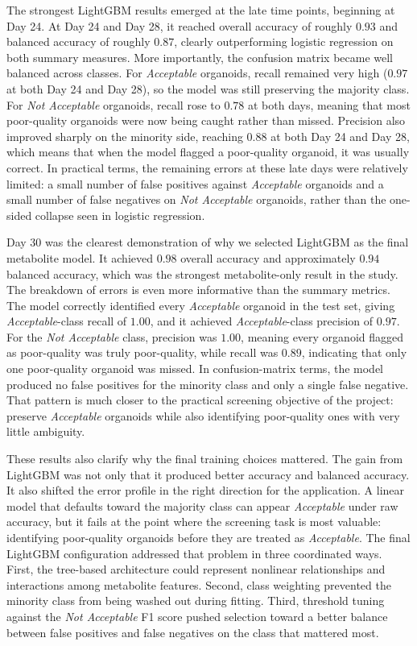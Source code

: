 \documentclass{article}
\begin{document}
The strongest LightGBM results emerged at the late time points, beginning at Day 24. At Day 24 and Day 28, it reached overall accuracy of roughly $0.93$ and balanced accuracy of roughly $0.87$, clearly outperforming logistic regression on both summary measures. More importantly, the confusion matrix became well balanced across classes. For \textit{Acceptable} organoids, recall remained very high ($0.97$ at both Day 24 and Day 28), so the model was still preserving the majority class. For \textit{Not Acceptable} organoids, recall rose to $0.78$ at both days, meaning that most poor-quality organoids were now being caught rather than missed. Precision also improved sharply on the minority side, reaching $0.88$ at both Day 24 and Day 28, which means that when the model flagged a poor-quality organoid, it was usually correct. In practical terms, the remaining errors at these late days were relatively limited: a small number of false positives against \textit{Acceptable} organoids and a small number of false negatives on \textit{Not Acceptable} organoids, rather than the one-sided collapse seen in logistic regression.

Day 30 was the clearest demonstration of why we selected LightGBM as the final metabolite model. It achieved $0.98$ overall accuracy and approximately $0.94$ balanced accuracy, which was the strongest metabolite-only result in the study. The breakdown of errors is even more informative than the summary metrics. The model correctly identified every \textit{Acceptable} organoid in the test set, giving \textit{Acceptable}-class recall of $1.00$, and it achieved \textit{Acceptable}-class precision of $0.97$. For the \textit{Not Acceptable} class, precision was $1.00$, meaning every organoid flagged as poor-quality was truly poor-quality, while recall was $0.89$, indicating that only one poor-quality organoid was missed. In confusion-matrix terms, the model produced no false positives for the minority class and only a single false negative. That pattern is much closer to the practical screening objective of the project: preserve \textit{Acceptable} organoids while also identifying poor-quality ones with very little ambiguity.

These results also clarify why the final training choices mattered. The gain from LightGBM was not only that it produced better accuracy and balanced accuracy. It also shifted the error profile in the right direction for the application. A linear model that defaults toward the majority class can appear \textit{Acceptable} under raw accuracy, but it fails at the point where the screening task is most valuable: identifying poor-quality organoids before they are treated as \textit{Acceptable}. The final LightGBM configuration addressed that problem in three coordinated ways. First, the tree-based architecture could represent nonlinear relationships and interactions among metabolite features. Second, class weighting prevented the minority class from being washed out during fitting. Third, threshold tuning against the \textit{Not Acceptable} F1 score pushed selection toward a better balance between false positives and false negatives on the class that mattered most.
\end{document}
